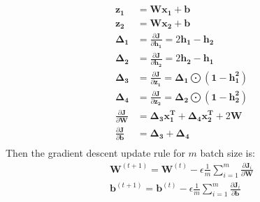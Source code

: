 \documentclass[11pt]{scrartcl} %
\begin{document}
\subsection{}
\begin{equation}
	\begin{aligned}
		\boldsymbol{z_1} &= \boldsymbol{Wx_1 + b} \\
		\boldsymbol{z_2} &= \boldsymbol{Wx_2 + b} \\
		\boldsymbol{\Delta_1 } &= \frac{\partial{\boldsymbol{J}}}{\partial{\boldsymbol{h_1}}} =
		2\boldsymbol{h_1 - h_2} \\
		\boldsymbol{\Delta_2 } &= \frac{\partial{\boldsymbol{J}}}{\partial{\boldsymbol{h_2}}} =
		2\boldsymbol{h_2 - h_1} \\
		\boldsymbol{\Delta_3} &= \frac{\partial{\boldsymbol{J}}}{\partial{\boldsymbol{z_1}}} =
		\boldsymbol{\Delta_1} \bigodot \boldsymbol{(1 - h_1^2)} \\
		\boldsymbol{\Delta_4} &= \frac{\partial{\boldsymbol{J}}}{\partial{\boldsymbol{z_2}}} =
		\boldsymbol{\Delta_2} \bigodot \boldsymbol{(1 - h_2^2)} \\
		\frac{\partial{\boldsymbol{J}}}{\partial{\boldsymbol{W}}} &= 
		\boldsymbol{\Delta_3 x_1^T +  \Delta_4 x_2^T} + 2 \boldsymbol{W} \\
		\frac{\partial{\boldsymbol{J}}}{\partial{\boldsymbol{b}}} &= 
		\boldsymbol{\Delta_3 +  \Delta_4} \\
	\end{aligned}
\end{equation}
Then the gradient descent update rule for $m$ batch size is:
\begin{equation}
	\begin{aligned}
		\boldsymbol{W}^{(t+1)} = \boldsymbol{W}^{(t)} - \epsilon \frac{1}{m}\sum_{i=1}^m\frac{\partial{\boldsymbol{J}_i}}{\partial{\boldsymbol{W}}} \\
		\boldsymbol{b}^{(t+1)} = \boldsymbol{b}^{(t)} - \epsilon \frac{1}{m}\sum_{i=1}^m\frac{\partial{\boldsymbol{J}_i}}{\partial{\boldsymbol{b}}} \\
	\end{aligned}
\end{equation}



\end{document}
